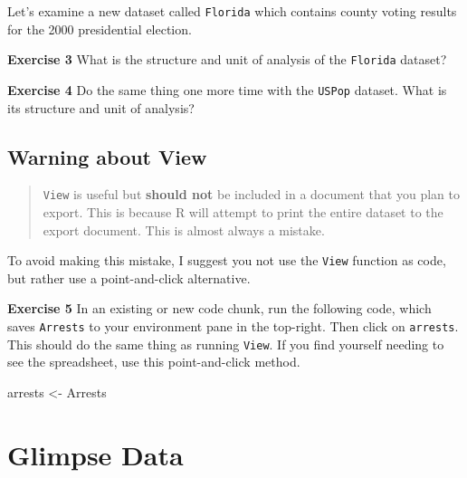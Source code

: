 \documentclass[
]{book}
\makeatletter
\newenvironment{Shaded}{\begin{snugshade}}{\end{snugshade}}
\newcommand{\NormalTok}[1]{#1}
\newcommand{\OtherTok}[1]{\textcolor[rgb]{0.37,0.37,0.37}{#1}}
\newenvironment{kframe}{%
\medskip{}
\setlength{\fboxsep}{.8em}
 \def\at@end@of@kframe{}%
 \ifinner\ifhmode%
  \def\at@end@of@kframe{\end{minipage}}%
  \begin{minipage}{\columnwidth}%
 \fi\fi%
 \def\FrameCommand##1{\hskip\@totalleftmargin \hskip-\fboxsep
 \colorbox{shadecolor}{##1}\hskip-\fboxsep
     \hskip-\linewidth \hskip-\@totalleftmargin \hskip\columnwidth}%
 \MakeFramed {\advance\hsize-\width
   \@totalleftmargin\z@ \linewidth\hsize
   \@setminipage}}%
 {\par\unskip\endMakeFramed%
 \at@end@of@kframe}
\renewenvironment{Shaded}{\begin{kframe}}{\end{kframe}}
\newenvironment{rmdblock}[1]
  {\begin{shaded*}
  }
  {\end{shaded*}
  }
\newenvironment{learncheck}
  {\begin{rmdblock}{warning}}
  {\end{rmdblock}}
\makeatother
\begin{document}
Let's examine a new dataset called \texttt{Florida} which contains county voting results for the 2000 presidential election.

\begin{learncheck}
\textbf{Exercise 3} What is the structure and unit of analysis of the
\texttt{Florida} dataset?
\end{learncheck}

\begin{learncheck}
\textbf{Exercise 4} Do the same thing one more time with the
\texttt{USPop} dataset. What is its structure and unit of analysis?
\end{learncheck}

\hypertarget{warning-about-view}{%
\subsection{Warning about View}\label{warning-about-view}}

\begin{quote}
\texttt{View} is useful but \textbf{should not} be included in a document that you plan to export. This is because R will attempt to print the entire dataset to the export document. This is almost always a mistake.
\end{quote}

To avoid making this mistake, I suggest you not use the \texttt{View} function as code, but rather use a point-and-click alternative.

\begin{learncheck}
\textbf{Exercise 5} In an existing or new code chunk, run the following
code, which saves \texttt{Arrests} to your environment pane in the
top-right. Then click on \texttt{arrests}. This should do the same thing
as running \texttt{View}. If you find yourself needing to see the
spreadsheet, use this point-and-click method.
\end{learncheck}

\begin{Shaded}
\begin{Highlighting}[]
\NormalTok{arrests }\OtherTok{\textless{}{-}}\NormalTok{ Arrests}
\end{Highlighting}
\end{Shaded}

\hypertarget{glimpse-data}{%
\section{Glimpse Data}\label{glimpse-data}}
\end{document}
